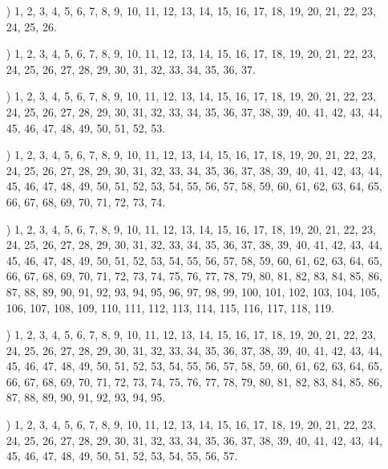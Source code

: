 \documentclass[a4paper,11pt]{article}
\numberwithin{equation}{section}
\begin{document}
\begin{itemize}

\item[\romannumeral1)] 1, 2, 3, 4, 5, 6, 7, 8, 9, 10, 11, 12, 13, 14, 15,
  16, 17, 18, 19, 20, 21, 22, 23, 24, 25, 26.

\item[\romannumeral2)] 1, 2, 3, 4, 5, 6, 7, 8, 9, 10, 11, 12, 13, 14, 15,
  16, 17, 18, 19, 20, 21, 22, 23, 24, 25, 26, 27, 28, 29, 30, 31, 32, 33,
  34, 35, 36, 37.

\item[\romannumeral3)] 1, 2, 3, 4, 5, 6, 7, 8, 9, 10, 11, 12, 13, 14, 15,
  16, 17, 18, 19, 20, 21, 22, 23, 24, 25, 26, 27, 28, 29, 30, 31, 32, 33,
  34, 35, 36, 37, 38, 39, 40, 41, 42, 43, 44, 45, 46, 47, 48, 49, 50, 51,
  52, 53.

\item[\romannumeral4)] 1, 2, 3, 4, 5, 6, 7, 8, 9, 10, 11, 12, 13, 14, 15,
  16, 17, 18, 19, 20, 21, 22, 23, 24, 25, 26, 27, 28, 29, 30, 31, 32, 33,
  34, 35, 36, 37, 38, 39, 40, 41, 42, 43, 44, 45, 46, 47, 48, 49, 50, 51,
  52, 53, 54, 55, 56, 57, 58, 59, 60, 61, 62, 63, 64, 65, 66, 67, 68, 69,
  70, 71, 72, 73, 74.

\item[\romannumeral5)] 1, 2, 3, 4, 5, 6, 7, 8, 9, 10, 11, 12, 13, 14, 15,
  16, 17, 18, 19, 20, 21, 22, 23, 24, 25, 26, 27, 28, 29, 30, 31, 32, 33,
  34, 35, 36, 37, 38, 39, 40, 41, 42, 43, 44, 45, 46, 47, 48, 49, 50, 51,
  52, 53, 54, 55, 56, 57, 58, 59, 60, 61, 62, 63, 64, 65, 66, 67, 68, 69,
  70, 71, 72, 73, 74, 75, 76, 77, 78, 79, 80, 81, 82, 83, 84, 85, 86, 87,
  88, 89, 90, 91, 92, 93, 94, 95, 96, 97, 98, 99, 100, 101, 102, 103, 104,
  105, 106, 107, 108, 109, 110, 111, 112, 113, 114, 115, 116, 117, 118, 119.

\item[\romannumeral6)] 1, 2, 3, 4, 5, 6, 7, 8, 9, 10, 11, 12, 13, 14, 15,
  16, 17, 18, 19, 20, 21, 22, 23, 24, 25, 26, 27, 28, 29, 30, 31, 32, 33,
  34, 35, 36, 37, 38, 39, 40, 41, 42, 43, 44, 45, 46, 47, 48, 49, 50, 51,
  52, 53, 54, 55, 56, 57, 58, 59, 60, 61, 62, 63, 64, 65, 66, 67, 68, 69,
  70, 71, 72, 73, 74, 75, 76, 77, 78, 79, 80, 81, 82, 83, 84, 85, 86, 87,
  88, 89, 90, 91, 92, 93, 94, 95.

\item[\romannumeral7)] 1, 2, 3, 4, 5, 6, 7, 8, 9, 10, 11, 12, 13, 14, 15,
  16, 17, 18, 19, 20, 21, 22, 23, 24, 25, 26, 27, 28, 29, 30, 31, 32, 33,
  34, 35, 36, 37, 38, 39, 40, 41, 42, 43, 44, 45, 46, 47, 48, 49, 50, 51,
  52, 53, 54, 55, 56, 57.


\end{itemize}
\end{document}
